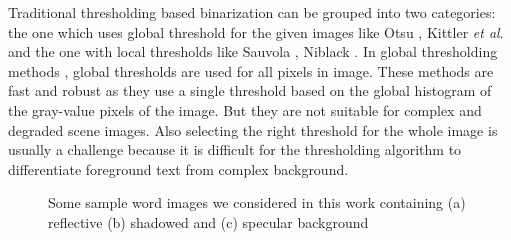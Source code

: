 Traditional thresholding based binarization can be grouped into two categories: the one which uses global
threshold for the given images like Otsu \cite{A2}, Kittler {\em et al}. 
\cite{A5} and the one with local thresholds like Sauvola \cite{A6},
Niblack \cite{A9}. In global thresholding methods \cite{A2,A7}, global thresholds are
used for all pixels in image. These methods are fast and robust as
they use a single threshold based on the global histogram of the gray-value pixels of the image.
But they are not suitable for complex
and degraded scene images. 
Also selecting the right threshold for the whole image is usually a challenge 
because it is difficult for the thresholding
algorithm to differentiate foreground text from complex background.
\begin{figure}[t]
\centering
{}
\caption
{Some sample word images we considered in this work containing (a) reflective (b) shadowed and (c) specular background}
\label{fig:1}
\end{figure}
